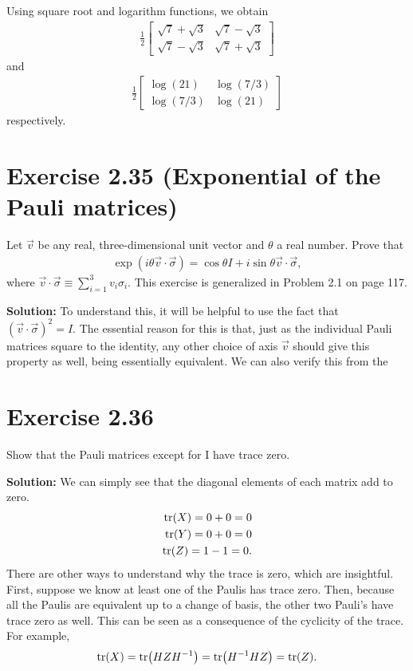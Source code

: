 \documentclass{book}
\begin{document}
    Using square root and logarithm functions, we obtain
    \begin{align}
        \frac{1}{2}\begin{bmatrix}
            \sqrt{7} + \sqrt{3} & \sqrt{7}-\sqrt{3} \\
            \sqrt{7}-\sqrt{3} & \sqrt{7} + \sqrt{3}
        \end{bmatrix}
    \end{align}
    and
    \begin{align}
        \frac{1}{2}\begin{bmatrix}
            \log(21) & \log(7/3) \\
            \log(7/3) & \log(21)
        \end{bmatrix}
    \end{align}
    respectively.
    
\section*{Exercise 2.35 (Exponential of the Pauli matrices)}
    Let $\vec{v}$ be any real, three-dimensional unit vector and $\theta$ a real number. Prove that
    \begin{align}
        \exp(i\theta \vec{v}\cdot \vec{\sigma}) = \cos \theta I + i \sin\theta \vec{v}\cdot\vec{\sigma},
    \end{align}
    where $\vec{v}\cdot\vec{\sigma}\equiv \sum_{i=1}^3 v_i\sigma_i$. This exercise is generalized in Problem 2.1 on page 117.

    \textbf{Solution:} To understand this, it will be helpful to use the fact that $(\vec{v}\cdot\vec{\sigma})^2 = I$. The essential reason for this is that, just as the individual Pauli matrices square to the identity, any other choice of axis $\vec{v}$ should give this property as well, being essentially equivalent. We can also verify this from the 
    
\section*{Exercise 2.36}
    Show that the Pauli matrices except for I have trace zero.
    
    \textbf{Solution:} We can simply see that the diagonal elements of each matrix add to zero.
    \begin{align}
    \begin{aligned}
        \tr(X) = 0 + 0 = 0 \\
        \tr(Y) = 0 + 0 = 0 \\
        \tr(Z) = 1 - 1 = 0. 
    \end{aligned}
    \end{align}
    There are other ways to understand why the trace is zero, which are insightful. First, suppose we know at least one of the Paulis has trace zero. Then, because all the Paulis are equivalent up to a change of basis, the other two Pauli's have trace zero as well. This can be seen as a consequence of the cyclicity of the trace. For example,
    \begin{align}
        \tr(X) = \tr(H Z H^{-1}) = \tr( H^{-1} H Z) = \tr(Z).
    \end{align}
    
\end{document}
